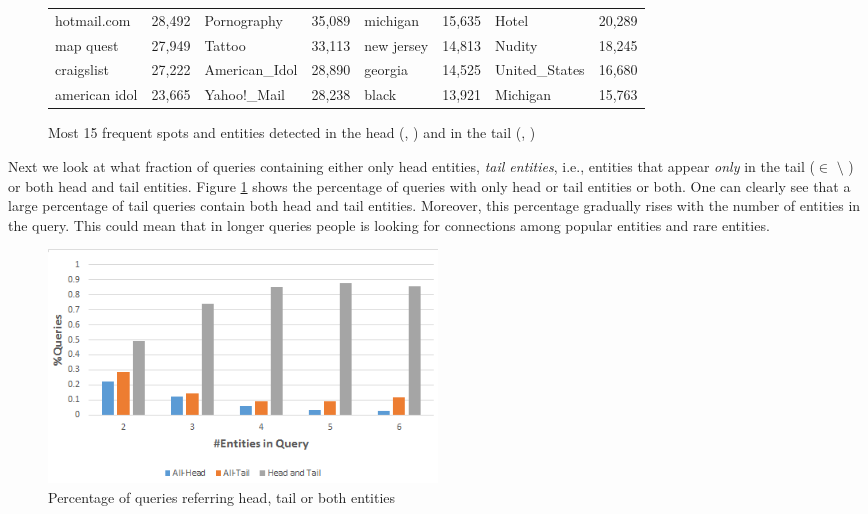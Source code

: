 \begin{figure}[t]
\begin{tabular}{lc|lc|lc|lc}
hotmail.com    & 28,492   &  Pornography       & 35,089   &  michigan    &   15,635  &   Hotel   		& 20,289 \\
map quest      & 27,949   &  Tattoo            & 33,113   &  new jersey  &   14,813  &   Nudity  		& 18,245 \\
craigslist     & 27,222   &  American\_Idol     & 28,890   &  georgia 	 &	14,525   &   United\_States   & 16,680 \\
american idol  & 23,665   &  Yahoo!\_Mail       & 28,238   &  black   	 &	13,921   &   Michigan        & 15,763 \\
\bottomrule
\end{tabular}
\caption{Most 15 frequent spots and entities detected in the head (\shead{}, \ehead{}) and in the tail (\stail{}, \etail{})}
\end{figure}


Next we look at what fraction of queries containing either only head entities, \emph{tail entities}, i.e., entities 
that appear \emph{only} in the tail ($\in$ \etail{} $\setminus$ \ehead{})
or both head and tail entities. Figure \ref{img:headTailEntPercent} shows the percentage of 
queries with only head or tail entities or both. One can clearly see that a large percentage of tail 
queries contain both head and tail entities. Moreover, this percentage gradually rises with the 
number of entities in the query. This could mean that in longer queries people is looking 
for connections among popular entities and rare entities. 

\begin{figure}
\label{img:headTailEntPercent}
  \centering
    \includegraphics[width = 0.5\textwidth]{images/entity-head-tail-count.png}
	
	\caption{Percentage of queries referring head, tail or both entities}
	
\end{figure}
 
